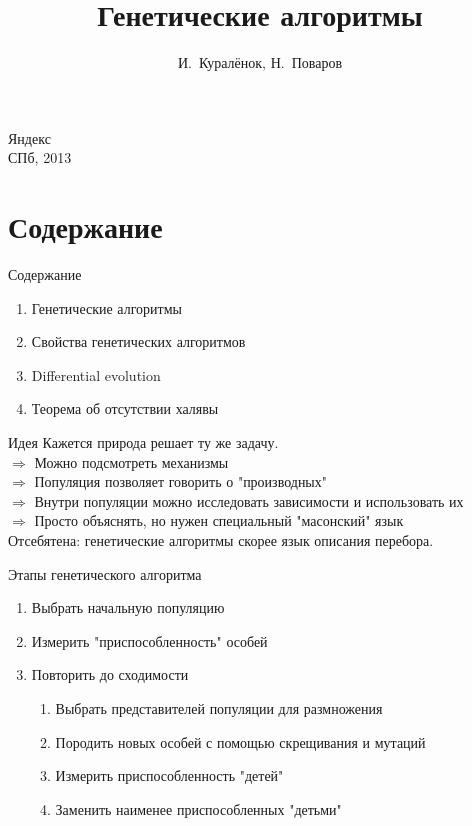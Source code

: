 \documentclass[14pt, fleqn, xcolor={dvipsnames, table}]{beamer}
\title{Генетические алгоритмы\\\small{}}
\author[]{\small{%
И.~Куралёнок,
Н.~Поваров}}
\date{}
\begin{document}
\begin{frame}
\maketitle
\small
\begin{center}
\vspace{-60pt}
\normalsize {\color{red}Я}ндекс \\
\vspace{80pt}
\footnotesize СПб, 2013
\end{center}
\end{frame}

\section{Содержание}
\begin{frame}{Содержание}
\begin{enumerate}
  \item Генетические алгоритмы
  \item Свойства генетических алгоритмов
  \item Differential evolution
  \item Теорема об отсутствии халявы
\end{enumerate}
\end{frame}

\begin{frame}{Идея}
Кажется природа решает ту же задачу. \\
$\Rightarrow$ Можно подсмотреть механизмы \\
$\Rightarrow$ Популяция позволяет говорить о "производных" \\
$\Rightarrow$ Внутри популяции можно исследовать зависимости и использовать их \\
$\Rightarrow$ Просто объяснять, но нужен специальный "масонский" язык \\
Отсебятена: генетические алгоритмы скорее язык описания перебора.
\end{frame}

\begin{frame}{Этапы генетического алгоритма}
\begin{enumerate}
  \item Выбрать начальную популяцию
  \item Измерить "приспособленность" особей
  \item Повторить до сходимости
  \begin{enumerate}
    \item Выбрать представителей популяции для размножения
    \item Породить новых особей с помощью скрещивания и мутаций
    \item Измерить приспособленность "детей"
    \item Заменить наименее приспособленных "детьми"
  \end{enumerate}
\end{enumerate}
\end{frame}
\end{document}
